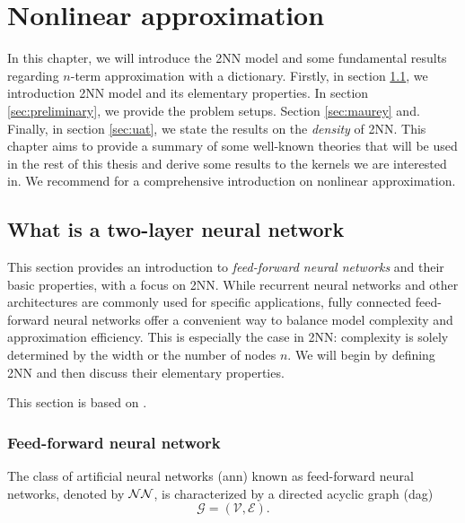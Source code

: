 \chapter{Nonlinear approximation}
\label{ch:preliminary}

In this chapter, we will introduce the 2NN model and some fundamental results
regarding $n$-term approximation with a dictionary. Firstly, in section
\ref{sec:what_is_2nn}, we introduction 2NN model and its elementary properties.
In section \ref{sec:preliminary}, we provide the problem setups. Section
\ref{sec:maurey} and. Finally, in section \ref{sec:uat}, we state the
results on the \textit{density} of 2NN. This chapter aims to provide a summary
of some well-known theories that will be used in the rest of this thesis and
derive some results to the kernels we are interested in. We recommend
\cite{devore_1998,pinkusApproximationTheoryMLP1999} for a comprehensive
introduction on nonlinear approximation.


\section{What is a two-layer neural network}
\label{sec:what_is_2nn}

This section provides an introduction to \textit{feed-forward neural networks}
and their basic properties, with a focus on 2NN. While recurrent neural networks
and other architectures are commonly used for specific applications, fully
connected feed-forward neural networks offer a convenient way to balance model
complexity and approximation efficiency. This is especially the case in 2NN:
complexity is solely determined by the width or the number of nodes $n$. We will
begin by defining 2NN and then discuss their elementary properties.

This section is based on \cite{devoreNeuralNetworkApproximation2021,
shalev-shwartzUnderstandingMachineLearning2014}.

\subsection{Feed-forward neural network}

The class of artificial neural networks (\gls{ann}) known as feed-forward neural
networks, denoted by $\mathcal{NN}$, is characterized by a directed acyclic graph
(\gls{dag})
\begin{equation*}
    \mathcal{G} = (\mathcal{V}, \mathcal{E}).
\end{equation*}

